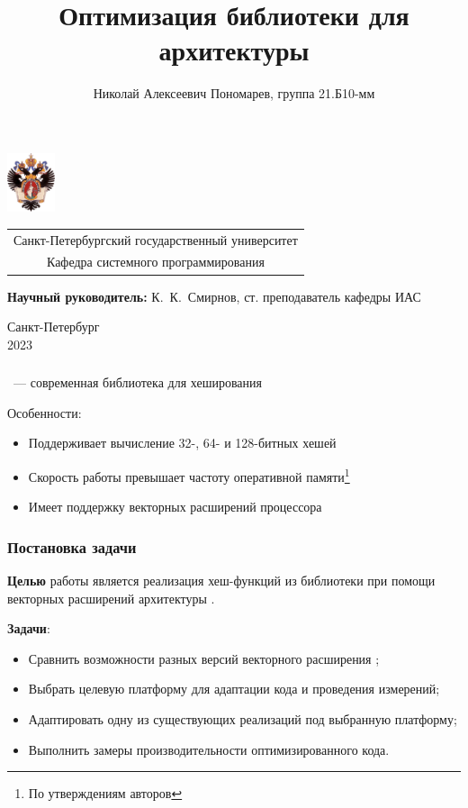 \documentclass[aspectratio=169]{beamer}
\title[Оптимизация \xxHash{}]{Оптимизация библиотеки \xxHash{} для архитектуры \riscv{}}
\institute[СПбГУ]{}
\author[Николай Пономарев]{Николай Алексеевич Пономарев, группа 21.Б10-мм}
\begin{document}
{
\begin{frame}
	\includegraphics[width=1.4cm]{pictures/SPbGU_Logo.png}
	\vspace{-35pt}
	\hspace{-10pt}
	\begin{center}
		\begin{tabular}{c}
			\scriptsize{Санкт-Петербургский государственный университет} \\
			\scriptsize{Кафедра системного программирования}
		\end{tabular}
		\titlepage
	\end{center}

	\btVFill

	{\scriptsize
		\textbf{Научный руководитель:} К.~К.~Смирнов, ст. преподаватель кафедры ИАС \\
	}
	\begin{center}
		\vspace{5pt}
		\scriptsize{Санкт-Петербург\\
			2023}
	\end{center}

\end{frame}
}

\begin{frame}
	\frametitle{\xxHash{}}
	\xxHash{}~--- современная библиотека для хеширования

	Особенности:
	\begin{itemize}
		\item Поддерживает вычисление 32-, 64- и 128-битных хешей
		\item Скорость работы превышает частоту оперативной памяти\footnote{По утверждениям авторов}
		\item Имеет поддержку векторных расширений процессора
	\end{itemize}
\end{frame}

\begin{frame}
	\frametitle{Постановка задачи}
	\textbf{Целью} работы является реализация хеш-функций из библиотеки \xxHash{} при помощи векторных расширений архитектуры \riscv{}.

	\textbf{Задачи}:
	\begin{itemize}
		\item Сравнить возможности разных версий векторного расширения \riscv{};
		\item Выбрать целевую платформу для адаптации кода и проведения измерений;
		\item Адаптировать одну из существующих реализаций под выбранную платформу;
		\item Выполнить замеры производительности оптимизированного кода.
	\end{itemize}
\end{frame}
\end{document}
